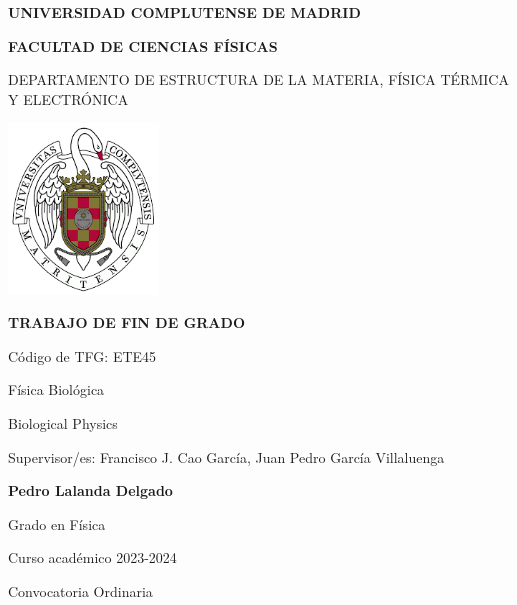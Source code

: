 \documentclass[a4paper,11pt,titlepage]{article}
\theoremstyle{definition}
\begin{document}
\pagestyle{fancy}
\fancyhf{}
\renewcommand{\headrulewidth}{2pt}
\renewcommand{\footrulewidth}{1pt}
\fancyhf[RF]{\footnotesize{\thepage}}
\setlength\parindent{0pt}
\setlength{\parskip}{3mm}



\begin{titlepage}
\centering
{ \bfseries \Large UNIVERSIDAD COMPLUTENSE DE MADRID}
\vspace{0.5cm}

{\bfseries  \Large FACULTAD DE CIENCIAS FÍSICAS} 
\vspace{1cm}

{\large DEPARTAMENTO DE ESTRUCTURA DE LA MATERIA, FÍSICA TÉRMICA Y ELECTRÓNICA}
\vspace{0.8cm}

{\includegraphics[width=0.3\textwidth]{UCM.png}}

\vspace{0.8cm}


{\bfseries \Large TRABAJO DE FIN DE GRADO}
\vspace{1cm}

{\Large Código de TFG:  ETE45 } \vspace{2mm}

{\Large Física Biológica}\vspace{2mm}

{\Large Biological Physics}\vspace{2mm}

{\Large Supervisor/es: Francisco J. Cao García, Juan Pedro García Villaluenga}\vspace{10mm} 

{\bfseries \LARGE Pedro Lalanda Delgado}\vspace{2mm} 

{\large Grado en Física}\vspace{2mm} 

{\large Curso acad\'emico 2023-2024}\vspace{2mm} 

{\large Convocatoria Ordinaria}\vspace{2mm} 

\end{titlepage}
\newpage
\end{document}
